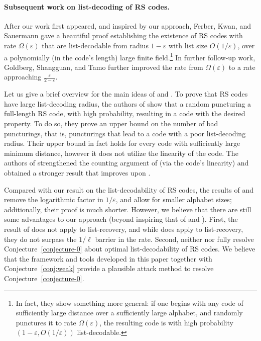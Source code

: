 \documentclass[11pt]{article}
\newcommand\black[1]{{\color{black} #1}}
\renewcommand{\epsilon}{\varepsilon}
\newcommand{\eps}{\epsilon}
\begin{document}
\paragraph{Subsequent work on list-decoding of RS codes.}
After our work first appeared, and inspired by our approach,  Ferber, Kwan, and Sauermann \cite{ferber2020} gave a beautiful proof establishing the existence of RS codes with rate $\Omega(\epsilon)$ that are list-decodable from radius $1-\epsilon$ with list size $O(1/\epsilon)$, over a polynomially (in the code's length) large finite field.\footnote{In fact, they show something more general: if one begins with any code of sufficiently large distance over a sufficiently large alphabet, and randomly punctures it to rate $\Omega(\eps)$, the resulting code is with high probability $(1 - \eps, O(1/\eps))$ list-decodable.} In further follow-up work, Goldberg, Shangguan, and Tamo \cite{goldberg2021listdecoding} further improved the rate from $\Omega(\eps)$ to a rate approaching $\frac{\eps}{2 - \eps}$.

\black{Let us give a brief overview for the main ideas of \cite{ferber2020} and \cite{goldberg2021listdecoding}. To prove that RS codes have large list-decoding radius, the authors of \cite{ferber2020} show that    a random puncturing a full-length RS code, with high probability,  resulting    in  a code with the desired property. To do so, they prove an upper bound on the number of bad puncturings, that is, puncturings that lead to a code with a poor list-decoding radius. Their upper bound in fact holds for every code with sufficiently large minimum distance, however it does not utilize the linearity of the code. The authors of \cite{goldberg2021listdecoding} strengthened the counting argument of \cite{ferber2020} (via the code's linearity) and obtained a stronger result that improves upon \cite{ferber2020}.}

Compared with our result on the list-decodability of RS codes, the results of \cite{ferber2020} and \cite{goldberg2021listdecoding} remove the logarithmic factor in $1/\eps$, and allow for smaller alphabet sizes; additionally, their proof is much shorter. However, we believe that there are still some advantages to our approach (beyond inspiring that of \cite{ferber2020} and \cite{goldberg2021listdecoding}).  First, the result of \cite{ferber2020} does not apply to list-recovery, and while \cite{goldberg2021listdecoding} does apply to list-recovery, they do not surpass the $1/\ell$ barrier in the rate.  Second, neither \cite{ferber2020} nor \cite{goldberg2021listdecoding} fully resolve Conjecture~\ref{conjecture-0} about optimal list-decodability of RS codes.  We believe that the framework and tools developed in this paper together with Conjecture~\ref{conj:weak} provide a plausible attack method to resolve Conjecture~\ref{conjecture-0}.
\end{document}
